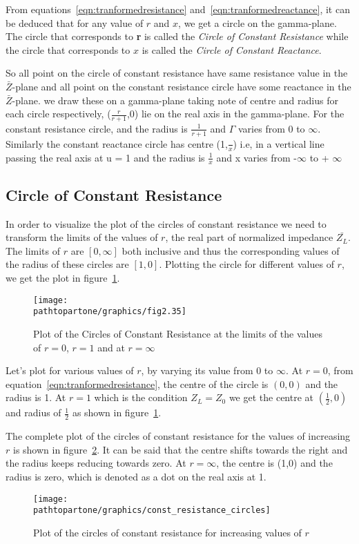 From equations~\eqref{eqn:tranformedresistance} and~\eqref{eqn:tranformedreactance}, it can be deduced that for any value of $r$ and $x$, we get a circle on the gamma-plane. The circle that corresponds to \textbf{r} is called the \emph{Circle of Constant Resistance} while the circle that corresponds to $x$ is called the \emph{Circle of Constant Reactance}.

So all point on the circle of constant resistance have same resistance value in the $\bar{Z}$-plane and all point on the constant resistance circle have some reactance in the $\bar{Z}$-plane. we draw these on a gamma-plane taking note of centre and radius for each circle respectively, ($\frac{r}{r + 1}$,0) lie on the real axis in the gamma-plane. For the constant resistance circle, and the radius is $\frac{1}{r + 1}$ and $\Gamma$ varies from 0 to $\infty$. Similarly the constant reactance circle has centre (1,$\frac{}{x}$) i.e, in a vertical line passing the real axis at u = 1 and the radius is $\frac{1}{x}$ and x varies from -$\infty$ to + $\infty$

\subsection{Circle of Constant Resistance}
In order to visualize the plot of the circles of constant resistance we need to transform the limits of the values of $r$, the real part of normalized impedance $\bar{Z_L}$. The limits of $r$ are $[0, \infty]$ both inclusive and thus the corresponding values of the radius of these circles are $[1, 0]$. Plotting the circle for different values of $r$, we get the plot in figure~\ref{fig:ouytre}.
\begin{figure}[h]
\centering
\texttt{[image: \\pathtopartone/graphics/fig2.35]}
\caption{Plot of the Circles of Constant Resistance at the limits of the values of $r = 0$, $r = 1$ and at $r = \infty$}
\label{fig:ouytre}
\end{figure}

Let's plot for various values of $r$, by varying its value from 0 to $\infty$. At $r = 0$, from equation~\eqref{eqn:tranformedresistance}, the centre of the circle is $(0,0)$ and the radius is 1. At $r = 1$ which is the condition $Z_L = Z_0$ we get the centre at $\left(\frac{1}{2}, 0\right)$ and radius of $\frac{1}{2}$ as shown in figure~\ref{fig:ouytre}.

The complete plot of the circles of constant resistance for the values of increasing $r$ is shown in figure~\ref{fig:rghmgfcx}. It can be said that the centre shifts towards the right and the radius keeps reducing towards zero. At $r = \infty$, the centre is (1,0) and the radius is zero, which is denoted as a dot on the real axis at 1.
\begin{figure}[h]
\centering
\texttt{[image: \\pathtopartone/graphics/const\_resistance\_circles]}
\caption{Plot of the circles of constant resistance for increasing values of $r$}
\label{fig:rghmgfcx}
\end{figure}


